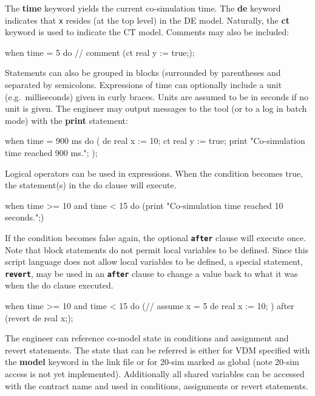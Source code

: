 \documentclass{crescendorepchap}
\newcommand{\vdmkeyw}[1]{{\bf\ttfamily #1}}
\begin{document}
The \vdmkeyw{time} keyword yields the current co-simulation time. The \vdmkeyw{de}
keyword indicates that \texttt{x} resides (at the top level) in the DE
model. Naturally, the \vdmkeyw{ct} keyword is used to indicate the CT model.
Comments may also be included:

\begin{dcl}
when time = 5 do
// comment
(ct real y := true;);
\end{dcl}

Statements can also be grouped in blocks (surrounded by parentheses and
separated by semicolons. Expressions of time can optionally include a
unit (e.g.\ milliseconds) given in curly braces. Units are assumed to be
in seconds if no unit is given. The engineer may output messages to the
tool (or to a log in batch mode) with the \vdmkeyw{print} statement:

\begin{dcl}
when time = 900 {ms} do
(
de real x := 10;
ct real y := true;
print "Co-simulation time reached 900 ms.";
);
\end{dcl}

Logical operators can be used in expressions. When the condition becomes
true, the statement(s) in the do clause will execute. 

\begin{dcl}
when time >= 10 and time < 15 do
(print "Co-simulation time reached 10 seconds.";)
\end{dcl}

If the condition
becomes false again, the optional \texttt{\textbf{after}} clause will execute once. Note
that block statements do not permit local variables to be defined. Since this script language does not allow local variables to be defined,
a special statement, \texttt{\textbf{revert}}, may be used in an \texttt{\textbf{after}} clause to change a
value back to what it was when the do clause executed.

\begin{dcl}
when time >= 10 and time < 15 do 
(// assume x = 5
 de real x := 10;
)
after (revert de real x;);
\end{dcl}

The engineer can reference co-model state in conditions and assignment
and revert statements. The state that can be referred is either for VDM
specified with the \vdmkeyw{model} keyword in the link file or for 20-sim
marked as global (note 20-sim access is not yet implemented).
Additionally all shared variables can be accessed with the contract name
and used in conditions, assignments or revert statements.
\end{document}
